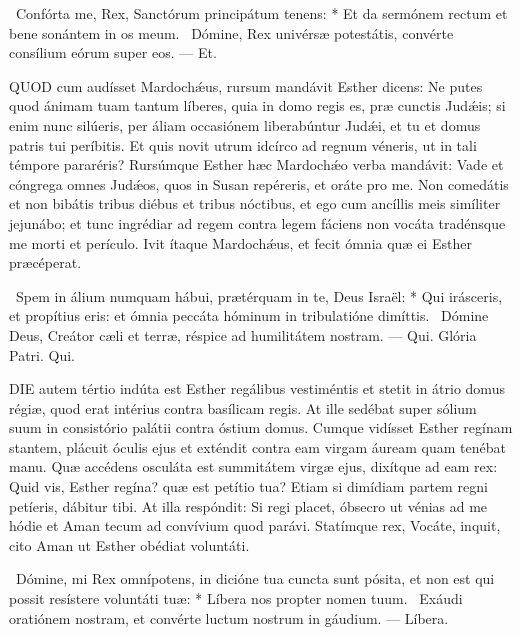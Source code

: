 \R\ Confórta me, Rex, Sanctórum principátum tenens: * Et da sermónem rectum et bene sonántem in os meum. \V\ Dómine, Rex univérsæ potestátis, convérte consílium eórum super eos. — Et.



\lettrine[lines=2]{Q}{UOD} cum audísset Mardochǽus, rursum mandávit Esther dicens: Ne putes quod ánimam tuam tantum líberes, quia in domo regis es, præ cunctis Judǽis; si enim nunc silúeris, per áliam occasiónem liberabúntur Judǽi, et tu et domus patris tui períbitis. Et quis novit utrum idcírco ad regnum véneris, ut in tali témpore pararéris? Rursúmque Esther hæc Mardochǽo verba mandávit: Vade et cóngrega omnes Judǽos, quos in Susan repéreris, et oráte pro me. Non comedátis et non bibátis tribus diébus et tribus nóctibus, et ego cum ancíllis meis simíliter jejunábo; et tunc ingrédiar ad regem contra legem fáciens non vocáta tradénsque me morti et perículo. Ivit ítaque Mardochǽus, et fecit ómnia quæ ei Esther præcéperat.

\R\ Spem in álium numquam hábui, prætérquam in te, Deus Israël: * Qui irásceris, et propítius eris: et ómnia peccáta hóminum in tribulatióne dimíttis. \V\ Dómine Deus, Creátor cæli et terræ, réspice ad humilitátem nostram. — Qui. Glória Patri. Qui.




\lettrine[lines=2]{D}{IE} autem tértio indúta est Esther regálibus vestiméntis et stetit in átrio domus régiæ, quod erat intérius contra basílicam regis. At ille sedébat super sólium suum in consistório palátii contra óstium domus. Cumque vidísset Esther regínam stantem, plácuit óculis ejus et exténdit contra eam virgam áuream quam tenébat manu. Quæ accédens osculáta est summitátem virgæ ejus, dixítque ad eam rex: Quid vis, Esther regína? quæ est petítio tua? Etiam si dimídiam partem regni petíeris, dábitur tibi. At illa respóndit: Si regi placet, óbsecro ut vénias ad me hódie et Aman tecum ad convívium quod parávi. Statímque rex, Vocáte, inquit, cito Aman ut Esther obédiat voluntáti.

\R\ Dómine, mi Rex omnípotens, in dicióne tua cuncta sunt pósita, et non est qui possit resístere voluntáti tuæ: * Líbera nos propter nomen tuum. \V\ Exáudi oratiónem nostram, et convérte luctum nostrum in gáudium. — Líbera.

